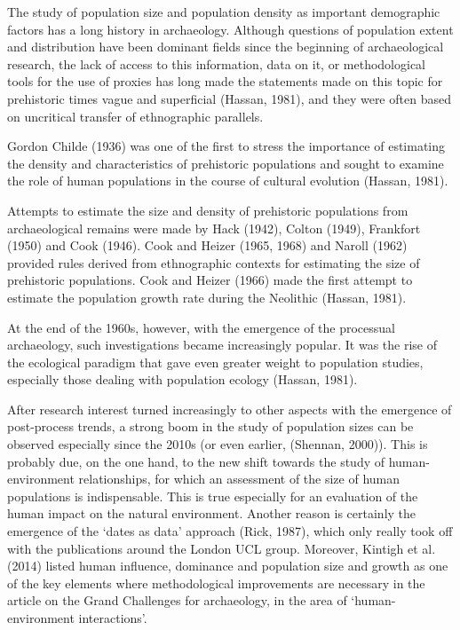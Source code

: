 \documentclass[
]{article}
\begin{document}
The study of population size and population density as important demographic factors has a long history in archaeology. Although questions of population extent and distribution have been dominant fields since the beginning of archaeological research, the lack of access to this information, data on it, or methodological tools for the use of proxies has long made the statements made on this topic for prehistoric times vague and superficial (Hassan, 1981), and they were often based on uncritical transfer of ethnographic parallels.

Gordon Childe (1936) was one of the first to stress the importance of estimating the density and characteristics of prehistoric populations and sought to examine the role of human populations in the course of cultural evolution (Hassan, 1981).

Attempts to estimate the size and density of prehistoric populations from archaeological remains were made by Hack (1942), Colton (1949), Frankfort (1950) and Cook (1946). Cook and Heizer (1965, 1968) and Naroll (1962) provided rules derived from ethnographic contexts for estimating the size of prehistoric populations. Cook and Heizer (1966) made the first attempt to estimate the population growth rate during the Neolithic (Hassan, 1981).

At the end of the 1960s, however, with the emergence of the processual archaeology, such investigations became increasingly popular. It was the rise of the ecological paradigm that gave even greater weight to population studies, especially those dealing with population ecology (Hassan, 1981).

After research interest turned increasingly to other aspects with the emergence of post-process trends, a strong boom in the study of population sizes can be observed especially since the 2010s (or even earlier, (Shennan, 2000)). This is probably due, on the one hand, to the new shift towards the study of human-environment relationships, for which an assessment of the size of human populations is indispensable. This is true especially for an evaluation of the human impact on the natural environment. Another reason is certainly the emergence of the `dates as data' approach (Rick, 1987), which only really took off with the publications around the London UCL group. Moreover, Kintigh et al. (2014) listed human influence, dominance and population size and growth as one of the key elements where methodological improvements are necessary in the article on the Grand Challenges for archaeology, in the area of `human-environment interactions'.
\end{document}

